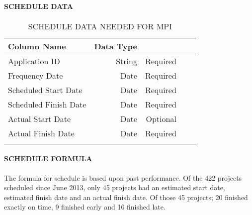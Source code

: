 \documentclass[SDSUThesis.tex]{subfiles}
\begin{document}
            \paragraph{SCHEDULE DATA}
            
                \begin{longtable}{@{}l rr rr}
                    \toprule%
                     \centering%
                     {\bfseries Column Name}
                     & {\bfseries Data Type}
                     &  \\
                    
                    \cmidrule[0.4pt](r{0.125em}){1-1}%
                    \cmidrule[0.4pt](lr{0.125em}){2-2}%
                    \cmidrule[0.4pt](l{0.125em}){3-3}%
                    \endhead
                    
                    Application ID & String  & Required \\
                    \myrowcolour%
                    Frequency Date & Date & Required \\
                    Scheduled Start Date & Date & Required \\
                    \myrowcolour%
                    Scheduled Finish Date & Date & Required \\
                    Actual Start Date & Date  & Optional \\
                    \myrowcolour%
                    Actual Finish Date & Date  & Required \\
                    
                    \bottomrule
                    
                    \caption{SCHEDULE DATA NEEDED FOR MPI}
                    \label{tab:sched}
                \end{longtable}
                    
            \paragraph{SCHEDULE FORMULA}
    
                The formula for schedule is based upon past performance.  Of the 422 projects
                scheduled since June 2013, only 45 projects had an estimated start date, estimated
                finish date and an actual finish date.  Of those 45 projects; 20 finished exactly on time,
                9 finished early and 16 finished late.  
                
\end{document}
